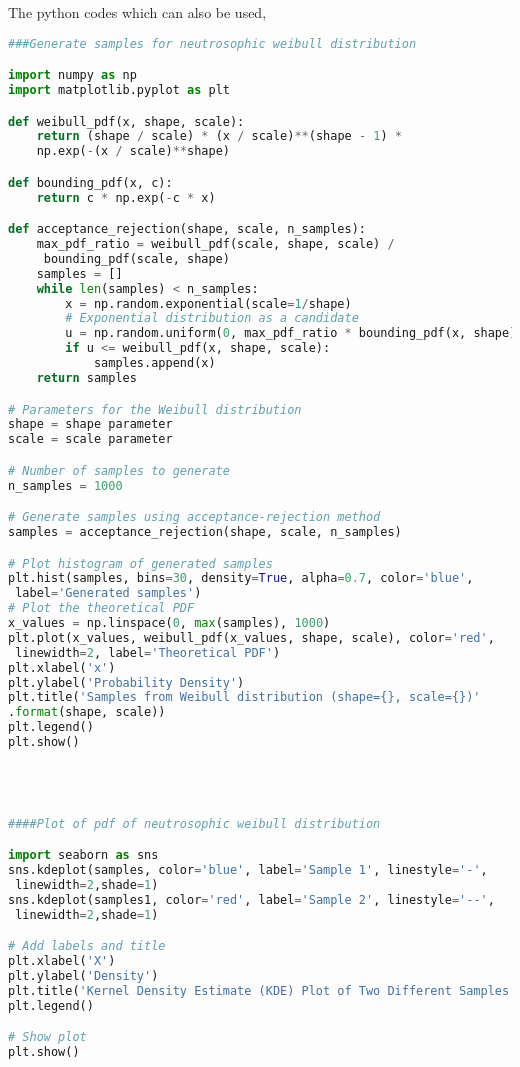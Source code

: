 \documentclass[12pt,a4paper,oneside]{article}
\begin{document}
\vspace*{3cm}
The python codes which can also be used,
\begin{lstlisting}[language=Python]
###Generate samples for neutrosophic weibull distribution

import numpy as np
import matplotlib.pyplot as plt

def weibull_pdf(x, shape, scale):
    return (shape / scale) * (x / scale)**(shape - 1) * 
    np.exp(-(x / scale)**shape)

def bounding_pdf(x, c):
    return c * np.exp(-c * x)

def acceptance_rejection(shape, scale, n_samples):
    max_pdf_ratio = weibull_pdf(scale, shape, scale) /
     bounding_pdf(scale, shape)
    samples = []
    while len(samples) < n_samples:
        x = np.random.exponential(scale=1/shape)  
        # Exponential distribution as a candidate
        u = np.random.uniform(0, max_pdf_ratio * bounding_pdf(x, shape))
        if u <= weibull_pdf(x, shape, scale):
            samples.append(x)
    return samples

# Parameters for the Weibull distribution
shape = shape parameter
scale = scale parameter

# Number of samples to generate
n_samples = 1000

# Generate samples using acceptance-rejection method
samples = acceptance_rejection(shape, scale, n_samples)

# Plot histogram of generated samples
plt.hist(samples, bins=30, density=True, alpha=0.7, color='blue',
 label='Generated samples')
# Plot the theoretical PDF
x_values = np.linspace(0, max(samples), 1000)
plt.plot(x_values, weibull_pdf(x_values, shape, scale), color='red',
 linewidth=2, label='Theoretical PDF')
plt.xlabel('x')
plt.ylabel('Probability Density')
plt.title('Samples from Weibull distribution (shape={}, scale={})'
.format(shape, scale))
plt.legend()
plt.show()




####Plot of pdf of neutrosophic weibull distribution

import seaborn as sns
sns.kdeplot(samples, color='blue', label='Sample 1', linestyle='-',
 linewidth=2,shade=1)
sns.kdeplot(samples1, color='red', label='Sample 2', linestyle='--',
 linewidth=2,shade=1)

# Add labels and title
plt.xlabel('X')
plt.ylabel('Density')
plt.title('Kernel Density Estimate (KDE) Plot of Two Different Samples')
plt.legend()

# Show plot
plt.show()
\end{lstlisting}
\end{document}
